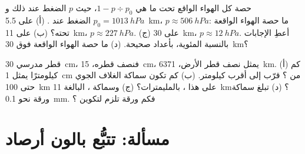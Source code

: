 \begin{exercise}[$\star\star\star$]\label{exo:g8:the-atmosphere:11}
حصة كل الهواء الواقع تحت  ما هي $1 - p \div
p_0$، حيث $p$ الضغط عند ذلك  و$p_0 =
\qty{1013}{hPa}$ الضغط عند . (أ) على  \qty{5.5}{km}، $p
\approx \qty{506}{hPa}$: ما حصة الهواء الواقعة تحته؟ (ب) على 
\qty{11}{km}، $p \approx \qty{227}{hPa}$. (ج) على  \qty{30}{km}، $p \approx
\qty{12}{hPa}$. أعطِ الإجابات بالنسبة المئوية، بأعداد صحيحة. (د) ما حصة الهواء الواقعة فوق \qty{30}{km}؟
\end{exercise}

\begin{exercise}[$\star\star\star$]\label{exo:g8:the-atmosphere:12}
قطر  مدرسي \qty{30}{cm}، فنصف قطره، \qty{15}{cm}،
يمثل نصف قطر الأرض، \qty{6371}{km}. (أ) كم كيلومترًا يمثل
\qty{1}{cm} من ؟ قرّب إلى أقرب كيلومتر.
(ب) كم تكون سماكة الغلاف الجوي حتى \qty{100}{km} على هذا ،
بالمليمترات؟ (ج) وسماكة ، البالغة \qty{11}{km}؟ (د) تبلغ سماكة
ورقة نحو \qty{0.1}{mm}. فكم ورقة تلزم لتكوين 
؟
\end{exercise}

\section{مسألة: تتبُّع بالون أرصاد}


